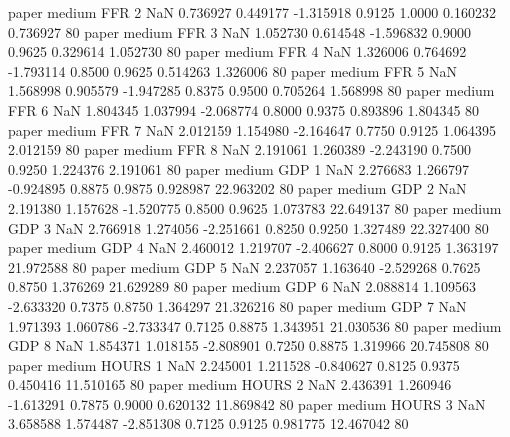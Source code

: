             paper     medium      FFR                 2                  NaN  0.736927 0.449177 -1.315918 0.9125 1.0000  0.160232    0.736927 80
            paper     medium      FFR                 3                  NaN  1.052730 0.614548 -1.596832 0.9000 0.9625  0.329614    1.052730 80
            paper     medium      FFR                 4                  NaN  1.326006 0.764692 -1.793114 0.8500 0.9625  0.514263    1.326006 80
            paper     medium      FFR                 5                  NaN  1.568998 0.905579 -1.947285 0.8375 0.9500  0.705264    1.568998 80
            paper     medium      FFR                 6                  NaN  1.804345 1.037994 -2.068774 0.8000 0.9375  0.893896    1.804345 80
            paper     medium      FFR                 7                  NaN  2.012159 1.154980 -2.164647 0.7750 0.9125  1.064395    2.012159 80
            paper     medium      FFR                 8                  NaN  2.191061 1.260389 -2.243190 0.7500 0.9250  1.224376    2.191061 80
            paper     medium      GDP                 1                  NaN  2.276683 1.266797 -0.924895 0.8875 0.9875  0.928987   22.963202 80
            paper     medium      GDP                 2                  NaN  2.191380 1.157628 -1.520775 0.8500 0.9625  1.073783   22.649137 80
            paper     medium      GDP                 3                  NaN  2.766918 1.274056 -2.251661 0.8250 0.9250  1.327489   22.327400 80
            paper     medium      GDP                 4                  NaN  2.460012 1.219707 -2.406627 0.8000 0.9125  1.363197   21.972588 80
            paper     medium      GDP                 5                  NaN  2.237057 1.163640 -2.529268 0.7625 0.8750  1.376269   21.629289 80
            paper     medium      GDP                 6                  NaN  2.088814 1.109563 -2.633320 0.7375 0.8750  1.364297   21.326216 80
            paper     medium      GDP                 7                  NaN  1.971393 1.060786 -2.733347 0.7125 0.8875  1.343951   21.030536 80
            paper     medium      GDP                 8                  NaN  1.854371 1.018155 -2.808901 0.7250 0.8875  1.319966   20.745808 80
            paper     medium    HOURS                 1                  NaN  2.245001 1.211528 -0.840627 0.8125 0.9375  0.450416   11.510165 80
            paper     medium    HOURS                 2                  NaN  2.436391 1.260946 -1.613291 0.7875 0.9000  0.620132   11.869842 80
            paper     medium    HOURS                 3                  NaN  3.658588 1.574487 -2.851308 0.7125 0.9125  0.981775   12.467042 80
